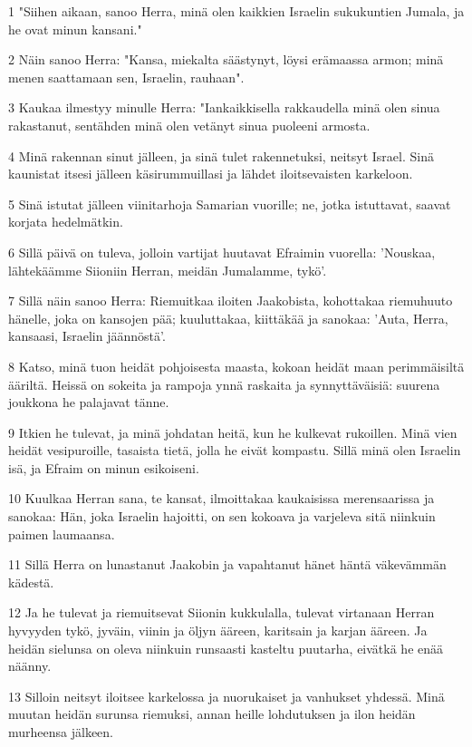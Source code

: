 \par 1 "Siihen aikaan, sanoo Herra, minä olen kaikkien Israelin sukukuntien Jumala, ja he ovat minun kansani."
\par 2 Näin sanoo Herra: "Kansa, miekalta säästynyt, löysi erämaassa armon; minä menen saattamaan sen, Israelin, rauhaan".
\par 3 Kaukaa ilmestyy minulle Herra: "Iankaikkisella rakkaudella minä olen sinua rakastanut, sentähden minä olen vetänyt sinua puoleeni armosta.
\par 4 Minä rakennan sinut jälleen, ja sinä tulet rakennetuksi, neitsyt Israel. Sinä kaunistat itsesi jälleen käsirummuillasi ja lähdet iloitsevaisten karkeloon.
\par 5 Sinä istutat jälleen viinitarhoja Samarian vuorille; ne, jotka istuttavat, saavat korjata hedelmätkin.
\par 6 Sillä päivä on tuleva, jolloin vartijat huutavat Efraimin vuorella: 'Nouskaa, lähtekäämme Siioniin Herran, meidän Jumalamme, tykö'.
\par 7 Sillä näin sanoo Herra: Riemuitkaa iloiten Jaakobista, kohottakaa riemuhuuto hänelle, joka on kansojen pää; kuuluttakaa, kiittäkää ja sanokaa: 'Auta, Herra, kansaasi, Israelin jäännöstä'.
\par 8 Katso, minä tuon heidät pohjoisesta maasta, kokoan heidät maan perimmäisiltä ääriltä. Heissä on sokeita ja rampoja ynnä raskaita ja synnyttäväisiä: suurena joukkona he palajavat tänne.
\par 9 Itkien he tulevat, ja minä johdatan heitä, kun he kulkevat rukoillen. Minä vien heidät vesipuroille, tasaista tietä, jolla he eivät kompastu. Sillä minä olen Israelin isä, ja Efraim on minun esikoiseni.
\par 10 Kuulkaa Herran sana, te kansat, ilmoittakaa kaukaisissa merensaarissa ja sanokaa: Hän, joka Israelin hajoitti, on sen kokoava ja varjeleva sitä niinkuin paimen laumaansa.
\par 11 Sillä Herra on lunastanut Jaakobin ja vapahtanut hänet häntä väkevämmän kädestä.
\par 12 Ja he tulevat ja riemuitsevat Siionin kukkulalla, tulevat virtanaan Herran hyvyyden tykö, jyväin, viinin ja öljyn ääreen, karitsain ja karjan ääreen. Ja heidän sielunsa on oleva niinkuin runsaasti kasteltu puutarha, eivätkä he enää näänny.
\par 13 Silloin neitsyt iloitsee karkelossa ja nuorukaiset ja vanhukset yhdessä. Minä muutan heidän surunsa riemuksi, annan heille lohdutuksen ja ilon heidän murheensa jälkeen.
